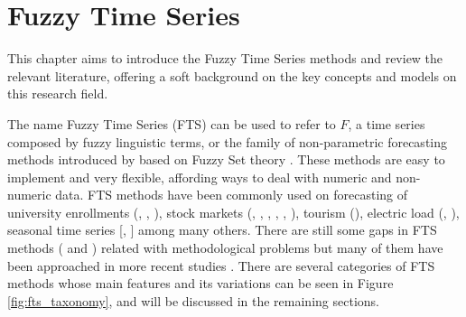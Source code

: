 \chapter[Fuzzy Time Series]{Fuzzy Time Series} 
\label{chap:review_fts}


This chapter aims to introduce the Fuzzy Time Series methods and review the relevant literature, offering a soft background on  the key concepts and models on this research field.

The name Fuzzy Time Series (FTS) can be used to refer to $F$, a time series composed by fuzzy linguistic terms, or the family of non-parametric forecasting methods introduced by \cite{song1993fuzzy} based on Fuzzy Set theory \cite{Zadeh1965}. These methods are easy to implement and very flexible, affording ways to  deal with numeric and non-numeric data.  FTS methods have been commonly used on forecasting of university enrollments (\cite{song1993fuzzy}, \cite{Song1994}, \cite{ismail2011enrollment}), 
stock markets (\cite{Sadaei2016}, \cite{Lee2013},  \cite{chen2014high}, \cite{Sun2015}, \cite{Talarposhti2016a}, \cite{efendi2013improved}), 
tourism (\cite{Lee2011}), 
electric load (\cite{Ismail2015}, \cite{Sadaei2017}),  
seasonal time series [\cite{Song1999},  \cite{Chang1997}] among many others.
There are still some gaps in FTS methods (\cite{Sadaei2013} and \cite{Georgescu2010}) related with methodological problems but many of them have been approached in more recent studies \cite{JavedaniSadaei2016c}. There are several categories of FTS methods whose main features and its variations can be seen in Figure \ref{fig:fts_taxonomy}, and will be discussed in the remaining sections.  

